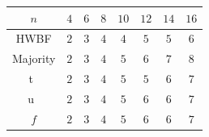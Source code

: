 \documentclass[11pt]{llncs}
\begin{document}

\begin{table}[h]
	\centering
	\begin{tabular}{|c| c|c|c|c| c|c|c|}
		\hline
		$n$ & $4$  & $6$  & $8$  &  $10$ & $12$ & $14$ & $16$  \\
		\hline	
		HWBF   & $2$  & $3$  & $4$  &  $4$ & $5$ & $5$ & $6$  \\  	
		\hline
		Majority   & $2$  & $3$  & $4$  &  $5$ & $6$ & $7$ & $8$  \\
		\hline
		t~\cite{DAM:MeaOza24}   & $2$  & $3$  & $4$  &  $5$ & $5$ & $6$ & $7$\\
		\hline	
		u~\cite{DAM:MeaOza24}   & $2$  & $3$  & $4$  &  $5$ & $6$ & $6$ & $7$ \\
		\hline						
		$f$  & $2$  & $3$  & $4$  &  $5$ & $6$ & $6$ & $7$\\
		\hline
	\end{tabular}
	\label{table:comparisonsAI}
\end{table}
\end{document}

